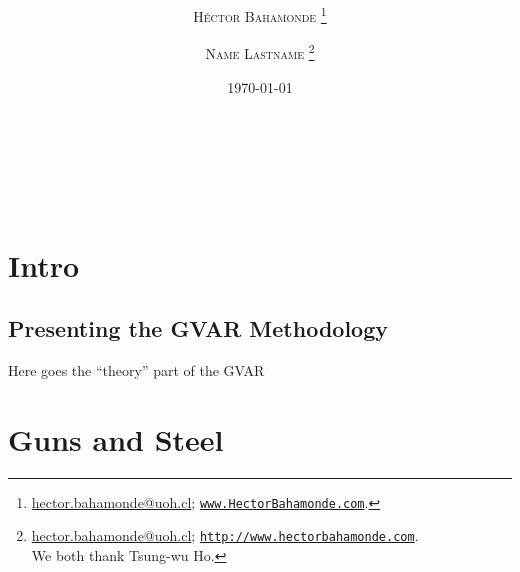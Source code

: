 \documentclass[onesided]{article}\usepackage[]{graphicx}\usepackage[]{color}
\title{\vspace{-15mm}\fontsize{18pt}{7pt}\selectfont\textbf{\unskip}} %
\author[1]{

\textsc{H\'ector Bahamonde}
\thanks{\href{mailto:hector.bahamonde@uoh.cl}{hector.bahamonde@uoh.cl}; \href{http://www.hectorbahamonde.com}{\texttt{www.HectorBahamonde.com}}.}}
\author[2]{

\textsc{Name Lastname}
\thanks{\href{mailto:hector.bahamonde@uoh.cl}{hector.bahamonde@uoh.cl}; 
\href{http://www.hectorbahamonde.com}{\texttt{http://www.hectorbahamonde.com}}. \\
We both thank Tsung-wu Ho.}}
\affil[1]{Assistant Professor, O$'$Higgins University (Chile)}
\affil[2]{Position, Institution}
\date{\today}
\begin{document}

\maketitle %


\begin{abstract}
\unskip
\end{abstract}


\\

\begin{center}
{\bf \unskip} \\
\end{center}

















\clearpage
\newpage
{}
\setcounter{page}{1}

\section{Intro}


\subsection{Presenting the GVAR Methodology}

Here goes the ``theory'' part of the GVAR

\section{Guns and Steel}
\end{document}
